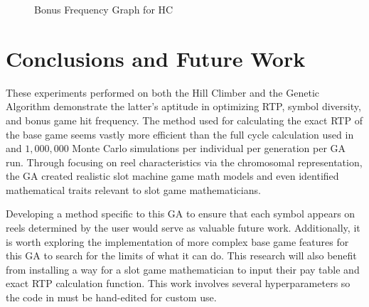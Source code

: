 \documentclass[conference]{IEEEtran}
\begin{document}
\begin{figure}[H]
	\centering
{}\datatable
{}
\caption{Bonus Frequency Graph for HC}\label{fig:bonusHC}
\end{figure}
\section{Conclusions and Future Work}
\label{conclusions}
These experiments performed on both the Hill Climber and the Genetic Algorithm demonstrate the latter's aptitude in optimizing RTP, symbol diversity, and bonus game hit frequency.
The method used for calculating the exact RTP of the base game seems vastly more efficient than the full cycle calculation used in \cite{keremedchiev2017slot} and $1,000,000$ Monte Carlo simulations per individual per generation per GA run.
Through focusing on reel characteristics via the chromosomal representation, the GA created realistic slot machine game math models and even identified mathematical traits relevant to slot game mathematicians.
\par
Developing a method specific to this GA to ensure that each symbol appears on reels determined by the user would serve as valuable future work.
Additionally, it is worth exploring the implementation of more complex base game features for this GA to search for the limits of what it can do.
This research will also benefit from installing a way for a slot game mathematician to input their pay table and exact RTP calculation function.
This work involves several hyperparameters so the code in \cite{ReelCharacteristicsRepo} must be hand-edited for custom use.
\printbibliography
\end{document}
